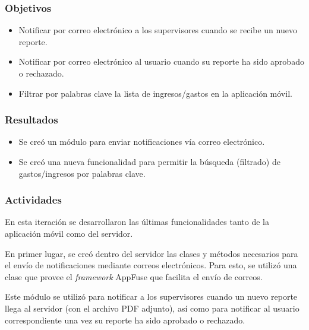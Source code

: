 \subsubsection{Objetivos}
\begin{itemize}
\item Notificar por correo electrónico a los supervisores cuando se recibe un nuevo reporte.
\item Notificar por correo electrónico al usuario cuando su reporte ha sido aprobado o rechazado.
\item Filtrar por palabras clave la lista de ingresos/gastos en la aplicación móvil.
\end{itemize}
\subsubsection{Resultados}
\begin{itemize}
\item Se creó un módulo para enviar notificaciones vía correo electrónico.
\item Se creó una nueva funcionalidad para permitir la búsqueda (filtrado) de gastos/ingresos por palabras clave.
\end{itemize}

\subsubsection{Actividades}

En esta iteración se desarrollaron las últimas funcionalidades tanto de la aplicación móvil como del servidor.

En primer lugar, se creó dentro del servidor las clases y métodos necesarios para el envío de notificaciones mediante correos electrónicos. Para esto, se utilizó una clase que provee el \textit{framework} AppFuse que facilita el envío de correos. 

Este módulo se utilizó para notificar a los supervisores cuando un nuevo reporte llega al servidor (con el archivo PDF adjunto), así como para notificar al usuario correspondiente una vez su reporte ha sido aprobado o rechazado.

